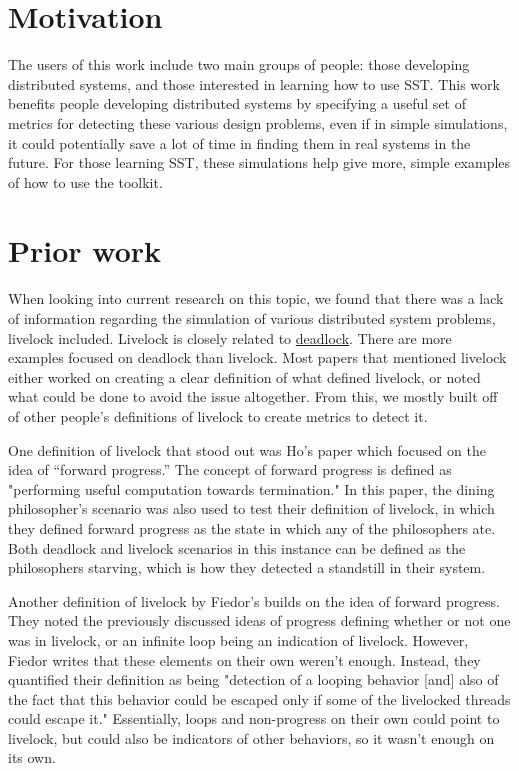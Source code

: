 \documentclass{article}
\begin{document}
\section{Motivation} %

The users of this work include two main groups of people: those developing distributed systems, and those interested in learning how to use SST.  This work benefits people developing distributed systems by specifying a useful set of metrics for detecting these various design problems, 
even if in simple simulations, it could potentially save a lot of time in finding them in real systems in the future.  
For those learning SST, these simulations help give more, simple examples of how to use the toolkit.

\section{Prior work} %

When looking into current research on this topic, we found that there was a lack of information regarding the simulation of various distributed system problems, livelock included.  Livelock is closely related to \href{https://en.wikipedia.org/wiki/Deadlock}{deadlock}. There are more examples focused on deadlock than livelock.  Most papers that mentioned livelock either worked on creating a clear definition of what defined livelock, or noted what could be done to avoid the issue altogether.  From this, we mostly built off of other people's definitions of livelock to create metrics to detect it. \newline

One definition of livelock that stood out was Ho's paper which focused on the idea of ``forward progress.''\cite{a.ho}  The concept of forward progress is defined as "performing useful computation towards termination."  In this paper, the dining philosopher's scenario was also used to test their definition of livelock, in which they defined forward progress as the state in which any of the philosophers ate.  Both deadlock and livelock scenarios in this instance can be defined as the philosophers starving, which is how they detected a standstill in their system. \newline

Another definition of livelock by Fiedor's \cite{j.fiedor} builds on the idea of forward progress. They noted the previously discussed ideas of progress defining whether or not one was in livelock, or an infinite loop being an indication of livelock.  However, Fiedor writes that these elements on their own weren't enough.  Instead, they quantified their definition as being "detection of a looping behavior [and] also of the fact that this behavior could be escaped only if some of the livelocked threads could escape it."\cite{j.fiedor}  Essentially, loops and non-progress on their own could point to livelock, but could also be indicators of other behaviors, so it wasn't enough on its own. \newline
\end{document}
